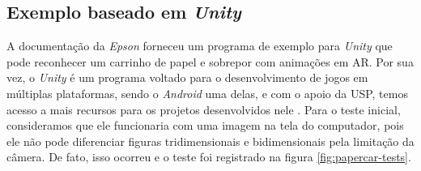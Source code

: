 

\subsection{Exemplo baseado em \textit{Unity}}\label{chp:moverio-unity}

A documentação da \textit{Epson} forneceu um programa de exemplo para \textit{Unity} que pode reconhecer um carrinho de papel e sobrepor com animações em AR. Por sua vez, o \textit{Unity} é um programa voltado para o desenvolvimento de jogos em múltiplas plataformas, sendo o \textit{Android} uma delas, e com o apoio da USP, temos acesso a mais recursos para os projetos desenvolvidos nele \cite{UnityOficial}. Para o teste inicial, consideramos que ele funcionaria com uma imagem na tela do computador, pois ele não pode diferenciar figuras tridimensionais e bidimensionais pela limitação da câmera. De fato, isso ocorreu e o teste foi registrado na figura \ref{fig:papercar-tests}.

